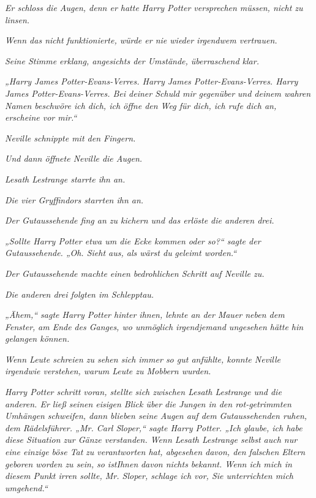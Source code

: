{\emph{Er schloss die Augen, denn er hatte Harry Potter versprechen müssen, nicht zu linsen.}

\emph{Wenn das nicht funktionierte, würde er nie wieder irgendwem vertrauen.}

\emph{Seine Stimme erklang, angesichts der Umstände, überraschend klar.}

\emph{„Harry James Potter-Evans-Verres. Harry James Potter-Evans-Verres. Harry James Potter-Evans-Verres. Bei deiner Schuld mir gegenüber} \emph{und deinem wahren Namen beschwöre ich dich, ich öffne den Weg für dich, ich rufe dich an,} \emph{erscheine vor mir.“}

\emph{Neville schnippte mit den Fingern.}

\emph{Und dann öffnete Neville die Augen.}

\emph{Lesath Lestrange starrte ihn an.}

\emph{Die vier Gryffindors starrten ihn an.}

\emph{Der Gutaussehende fing an zu kichern und das erlöste die anderen drei.}

\emph{„Sollte Harry Potter etwa um die Ecke kommen oder so?“ sagte der Gutaussehende. „Oh. Sieht aus, als wärst du} \emph{geleimt worden.“}

\emph{Der Gutaussehende machte einen bedrohlichen Schritt auf Neville zu.}

\emph{Die anderen drei folgten im Schlepptau.}

\emph{„Ähem,“ sagte Harry Potter hinter ihnen, lehnte an der} \emph{Mauer neben dem Fenster,} \emph{am Ende} \emph{des Ganges, wo unmöglich irgendjemand ungesehen hätte hin gelangen können.}

\emph{Wenn Leute schreien zu sehen sich immer so gut anfühlte, konnte Neville irgendwie verstehen, warum Leute zu Mobbern wurden.}

\emph{Harry Potter schritt voran, stellte sich zwischen Lesath Lestrange und die anderen. Er ließ seinen eisigen Blick über die Jungen in den rot-getrimmten Umhängen schweifen, dann blieben seine Augen auf dem} \emph{Gutaussehenden ruhen, dem} \emph{Rädelsführer. „Mr. Carl Sloper,“ sagte Harry Potter. „Ich glaube, ich habe diese Situation zur Gänze verstanden. Wenn Lesath Lestrange selbst auch nur eine einzige böse Tat} \emph{zu verantworten hat, abgesehen davon, den falschen Eltern geboren worden zu sein,} \emph{so ist\emph{Ihnen}} \emph{davon nichts bekannt. Wenn ich mich in diesem Punkt irren sollte, Mr. Sloper, schlage ich vor, Sie unterrichten mich umgehend.“}

}
